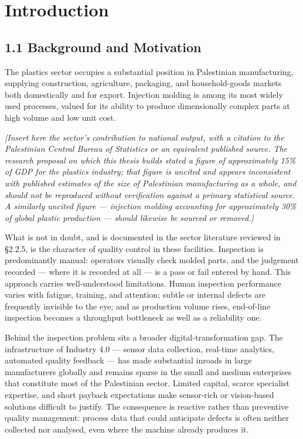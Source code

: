 \hypertarget{introduction}{%
\chapter{Introduction}\label{introduction}}

\hypertarget{background-and-motivation}{%
\section{1.1 Background and Motivation}\label{background-and-motivation}}

The plastics sector occupies a substantial position in Palestinian manufacturing, supplying construction, agriculture, packaging, and household-goods markets both domestically and for export. Injection molding is among its most widely used processes, valued for its ability to produce dimensionally complex parts at high volume and low unit cost.

\emph{{[}Insert here the sector's contribution to national output, with a citation to the Palestinian Central Bureau of Statistics or an equivalent published source. The research proposal on which this thesis builds stated a figure of approximately 15\% of GDP for the plastics industry; that figure is uncited and appears inconsistent with published estimates of the size of Palestinian manufacturing as a whole, and should not be reproduced without verification against a primary statistical source. A similarly uncited figure --- injection molding accounting for approximately 30\% of global plastic production --- should likewise be sourced or removed.{]}}

What is not in doubt, and is documented in the sector literature reviewed in §2.2.5, is the character of quality control in these facilities. Inspection is predominantly manual: operators visually check molded parts, and the judgement recorded --- where it is recorded at all --- is a pass or fail entered by hand. This approach carries well-understood limitations. Human inspection performance varies with fatigue, training, and attention; subtle or internal defects are frequently invisible to the eye; and as production volume rises, end-of-line inspection becomes a throughput bottleneck as well as a reliability one.

Behind the inspection problem sits a broader digital-transformation gap. The infrastructure of Industry 4.0 --- sensor data collection, real-time analytics, automated quality feedback --- has made substantial inroads in large manufacturers globally and remains sparse in the small and medium enterprises that constitute most of the Palestinian sector. Limited capital, scarce specialist expertise, and short payback expectations make sensor-rich or vision-based solutions difficult to justify. The consequence is reactive rather than preventive quality management: process data that could anticipate defects is often neither collected nor analysed, even where the machine already produces it.

